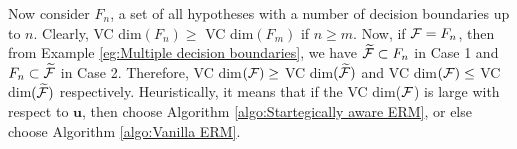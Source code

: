 Now consider $F_n$, a set of all hypotheses with a number of decision boundaries up to $n$. Clearly, VC dim$(F_n) \geq $ VC dim$(F_m)$ if $n \geq m$. Now, if $\mathcal{F} = F_n$, then from Example \ref{eg:Multiple decision boundaries}, we have $\widetilde{\mathcal{F}} \subset F_n$ in Case 1 and $F_n \subset \widetilde{\mathcal{F}}$ in Case 2. Therefore, VC dim$(\mathcal{F}) \geq$ VC dim$(\widetilde{\mathcal{F}})$ and VC dim$(\mathcal{F}) \leq$ VC dim$(\widetilde{\mathcal{F}})$ respectively. Heuristically, it means that if the VC dim($\mathcal{F}$) is large with respect to $\mathbf{u}$, then choose Algorithm \ref{algo:Startegically aware ERM}, or else choose Algorithm \ref{algo:Vanilla ERM}.
